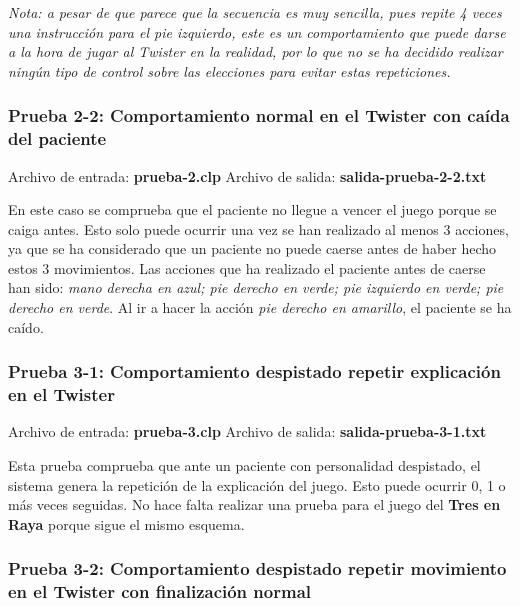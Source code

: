 \documentclass{uc3mpracticas}
\begin{document}
  \vspace{1mm}

  \textit{Nota: a pesar de que parece que la secuencia es muy sencilla, pues repite 4 veces una instrucción para el pie izquierdo, este es un comportamiento que puede darse a la hora de jugar al Twister en la realidad, por lo que no se ha decidido realizar ningún tipo de control sobre las elecciones para evitar estas repeticiones.}

  \subsubsection{Prueba 2-2: Comportamiento normal en el Twister con caída del paciente}


  Archivo de entrada: \textbf{prueba-2.clp} \hspace{15mm} Archivo de salida: \textbf{salida-prueba-2-2.txt}

  \vspace{2mm}

  En este caso se comprueba que el paciente no llegue a vencer el juego porque se caiga antes. Esto solo puede ocurrir una vez se han realizado al menos 3 acciones, ya que se ha considerado que un paciente no puede caerse antes de haber hecho estos 3 movimientos. Las acciones que ha realizado el paciente antes de caerse han sido: \textit{mano derecha en azul; pie derecho en verde; pie izquierdo en verde; pie derecho en verde}. Al ir a hacer la acción \textit{pie derecho en amarillo}, el paciente se ha caído.


  \subsubsection{Prueba 3-1: Comportamiento despistado repetir explicación en el Twister}


  Archivo de entrada: \textbf{prueba-3.clp} \hspace{15mm} Archivo de salida: \textbf{salida-prueba-3-1.txt}

  \vspace{2mm}

  Esta prueba comprueba que ante un paciente con personalidad despistado, el sistema genera la repetición de la explicación del juego. Esto puede ocurrir 0, 1 o más veces seguidas. No hace falta realizar una prueba para el juego del \textbf{Tres en Raya} porque sigue el mismo esquema.


  \subsubsection{Prueba 3-2: Comportamiento despistado repetir movimiento en el Twister con finalización normal}
\end{document}
